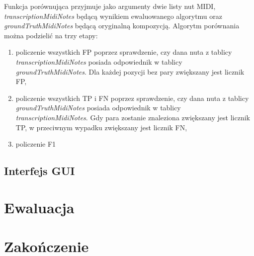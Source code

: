 \documentclass[12pt,a4paper,twoside]{mwart}
\begin{document}
Funkcja porównująca przyjmuje jako argumenty dwie listy nut MIDI, \textit{transcriptionMidiNotes} będącą wynikiem ewaluowanego algorytmu oraz \textit{groundTruthMidiNotes} będącą oryginalną kompozycją. Algorytm porównania można podzielić na trzy etapy:
\begin{enumerate}
  \item policzenie wszystkich FP poprzez sprawdzenie, czy dana nuta z tablicy \textit{transcriptionMidiNotes} posiada odpowiednik w tablicy \textit{groundTruthMidiNotes}. Dla każdej pozycji bez pary zwiększany jest licznik FP,
  \item policzenie wszystkich TP i FN poprzez sprawdzenie, czy dana nuta z tablicy \textit{groundTruthMidiNotes} posiada odpowiednik w tablicy \textit{transcriptionMidiNotes}. Gdy para zostanie znaleziona zwiększany jest licznik TP, w przeciwnym wypadku zwiększany jest licznik FN,
  \item policzenie F1
\end{enumerate}

\subsection{Interfejs GUI}\label{sec:impl:gui}
\cite{reactWDzialaniu}\cite{tsDocumentation}

\section{Ewaluacja} \label{sec:ewal}
\newpage
\section{Zakończenie} \label{sec:end}
\newpage
\end{document}
